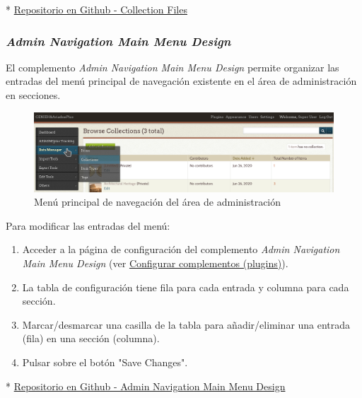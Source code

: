 \documentclass[
]{article}
\providecommand{\tightlist}{%
  \setlength{\itemsep}{0pt}\setlength{\parskip}{0pt}}
\begin{document}
*
\href{https://github.com/gcm1001/TFG-CeniehAriadne/tree/master/omeka/plugins/CollectionFiles}{Repositorio
en Github - Collection Files}

\hypertarget{admin-navigation-main-menu-design}{%
\subsubsection{\texorpdfstring{\emph{Admin Navigation Main Menu
Design}}{Admin Navigation Main Menu Design}}\label{admin-navigation-main-menu-design}}

El complemento \emph{Admin Navigation Main Menu Design} permite
organizar las entradas del menú principal de navegación existente en el
área de administración en secciones.

\begin{figure}
\hypertarget{admin-nav-menu}{%
\centering
\includegraphics{../_static/images/admin-nav-menu.png}
\caption{Menú principal de navegación del área de
administración}\label{admin-nav-menu}
}
\end{figure}

Para modificar las entradas del menú:

\begin{enumerate}
\def\labelenumi{\arabic{enumi}.}
\tightlist
\item
  Acceder a la página de configuración del complemento \emph{Admin
  Navigation Main Menu Design} (ver
  \protect\hyperlink{configurar-complementos-plugins}{Configurar
  complementos (plugins)}).
\item
  La tabla de configuración tiene fila para cada entrada y columna para
  cada sección.
\item
  Marcar/desmarcar una casilla de la tabla para añadir/eliminar una
  entrada (fila) en una sección (columna).
\item
  Pulsar sobre el botón "Save Changes".
\end{enumerate}

*
\href{https://github.com/gcm1001/TFG-CeniehAriadne/tree/master/omeka/plugins/AdminMenuDesign}{Repositorio
en Github - Admin Navigation Main Menu Design}
\end{document}
